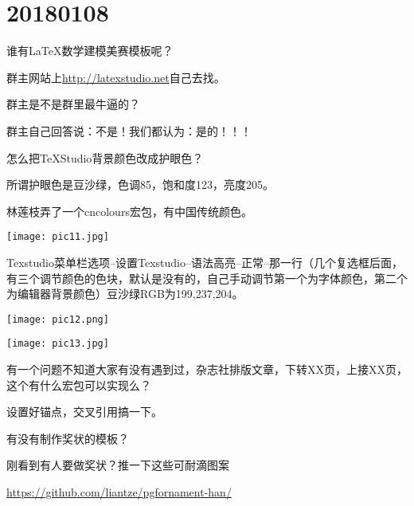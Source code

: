 \documentclass[QA.tex]{subfiles}
\begin{document}
%
%

\chapter{20180108}\label{ch180108}

\begin{qst}\label{Q2018010801}
谁有\LaTeX{}数学建模美赛模板呢？
\end{qst}
\ans 群主网站上\href{http://www.latexstudio.net/archives/category/latex-templates/mcm-tex-template}{http://latexstudio.net}自己去找。

\begin{qst}\label{Q2018010802}
群主是不是群里最牛逼的？
\end{qst}
\ans 群主自己回答说：不是！\qquad 我们都认为：是的！！！

\begin{qst}\label{Q2018010803}
怎么把TeXStudio背景颜色改成护眼色？
\end{qst}
\ans
所谓护眼色是豆沙绿，色调85，饱和度123，亮度205。

林莲枝弄了一个cncolours宏包，有中国传统颜色。

\texttt{[image: pic11.jpg]}

Texstudio菜单栏选项--设置Texstudio--语法高亮--正常--那一行（几个复选框后面，有三个调节颜色的色块，默认是没有的，自己手动调节第一个为字体颜色，第二个为编辑器背景颜色）豆沙绿RGB为199,237,204。

\texttt{[image: pic12.png]}

\texttt{[image: pic13.jpg]}

\begin{qst}\label{Q2018010804}
有一个问题不知道大家有没有遇到过，杂志社排版文章，下转XX页，上接XX页，这个有什么宏包可以实现么？
\end{qst}
\ans 设置好锚点，交叉引用搞一下。

\begin{qst}\label{Q2018010805}
有没有制作奖状的模板？
\end{qst}
\ans 刚看到有人要做奖状？推一下这些可耐滴图案

 \href{https://github.com/liantze/pgfornament-han/}%
 {https://github.com/liantze/pgfornament-han/}  
 
\end{document}
